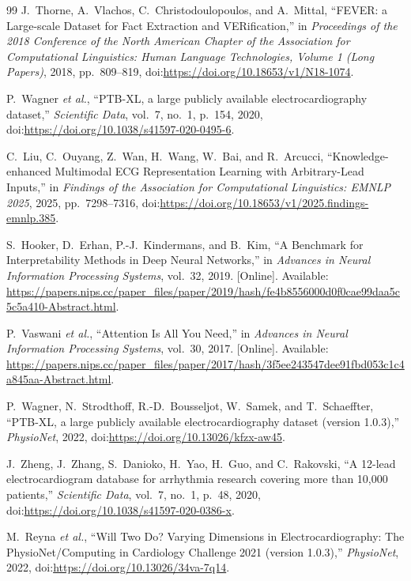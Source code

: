 \begin{thebibliography}{99}
J.~Thorne, A.~Vlachos, C.~Christodoulopoulos, and A.~Mittal, ``FEVER: a Large-scale Dataset for Fact Extraction and VERification,'' in \textit{Proceedings of the 2018 Conference of the North American Chapter of the Association for Computational Linguistics: Human Language Technologies, Volume 1 (Long Papers)}, 2018, pp.~809--819, doi:\url{https://doi.org/10.18653/v1/N18-1074}.

P.~Wagner \textit{et al.}, ``PTB-XL, a large publicly available electrocardiography dataset,'' \textit{Scientific Data}, vol.~7, no.~1, p.~154, 2020, doi:\url{https://doi.org/10.1038/s41597-020-0495-6}.

C.~Liu, C.~Ouyang, Z.~Wan, H.~Wang, W.~Bai, and R.~Arcucci, ``Knowledge-enhanced Multimodal ECG Representation Learning with Arbitrary-Lead Inputs,'' in \textit{Findings of the Association for Computational Linguistics: EMNLP 2025}, 2025, pp.~7298--7316, doi:\url{https://doi.org/10.18653/v1/2025.findings-emnlp.385}.

S.~Hooker, D.~Erhan, P.-J.~Kindermans, and B.~Kim, ``A Benchmark for Interpretability Methods in Deep Neural Networks,'' in \textit{Advances in Neural Information Processing Systems}, vol.~32, 2019. [Online]. Available: \url{https://papers.nips.cc/paper_files/paper/2019/hash/fe4b8556000d0f0cae99daa5c5c5a410-Abstract.html}.

P.~Vaswani \textit{et al.}, ``Attention Is All You Need,'' in \textit{Advances in Neural Information Processing Systems}, vol.~30, 2017. [Online]. Available: \url{https://papers.nips.cc/paper_files/paper/2017/hash/3f5ee243547dee91fbd053c1c4a845aa-Abstract.html}.

P.~Wagner, N.~Strodthoff, R.-D.~Bousseljot, W.~Samek, and T.~Schaeffter, ``PTB-XL, a large publicly available electrocardiography dataset (version 1.0.3),'' \textit{PhysioNet}, 2022, doi:\url{https://doi.org/10.13026/kfzx-aw45}.

J.~Zheng, J.~Zhang, S.~Danioko, H.~Yao, H.~Guo, and C.~Rakovski, ``A 12-lead electrocardiogram database for arrhythmia research covering more than 10,000 patients,'' \textit{Scientific Data}, vol.~7, no.~1, p.~48, 2020, doi:\url{https://doi.org/10.1038/s41597-020-0386-x}.

M.~Reyna \textit{et al.}, ``Will Two Do? Varying Dimensions in Electrocardiography: The PhysioNet/Computing in Cardiology Challenge 2021 (version 1.0.3),'' \textit{PhysioNet}, 2022, doi:\url{https://doi.org/10.13026/34va-7q14}.


\end{thebibliography}
